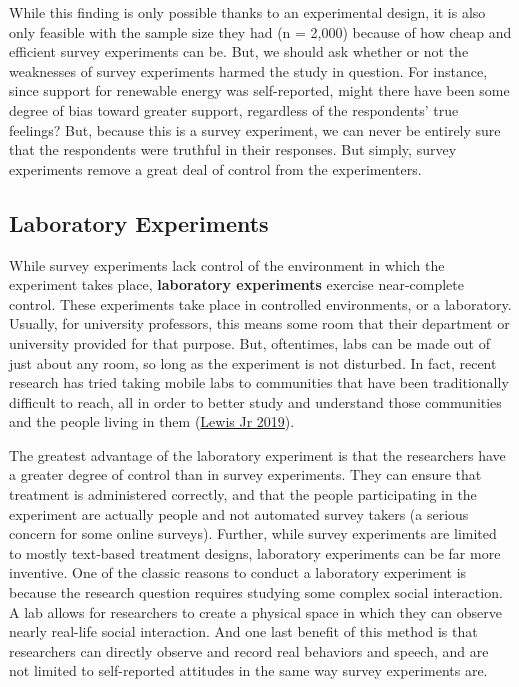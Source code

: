 \documentclass{book}
\begin{document}
While this finding is only possible thanks to an experimental design, it is
also only feasible with the sample size they had (n = 2,000) because of how
cheap and efficient survey experiments can be. But, we should ask whether or
not the weaknesses of survey experiments harmed the study in question. For
instance, since support for renewable energy was self-reported, might there
have been some degree of bias toward greater support, regardless of the
respondents' true feelings? But, because this is a survey experiment, we can
never be entirely sure that the respondents were truthful in their responses.
But simply, survey experiments remove a great deal of control from the
experimenters.

\hypertarget{laboratory-experiments}{%
\subsection{Laboratory Experiments}\label{laboratory-experiments}}

While survey experiments lack control of the environment in which the
experiment takes place, \textbf{laboratory experiments} exercise near-complete
control. These experiments take place in controlled environments, or a
laboratory. Usually, for university professors, this means some room that
their department or university provided for that purpose. But, oftentimes,
labs can be made out of just about any room, so long as the experiment is not
disturbed. In fact, recent research has tried taking mobile labs to
communities that have been traditionally difficult to reach, all in order to
better study and understand those communities and the people living in them
(\protect\hyperlink{ref-neil_a._lewis_studying_2019}{Lewis Jr 2019}).

The greatest advantage of the laboratory experiment is that the researchers
have a greater degree of control than in survey experiments. They can ensure
that treatment is administered correctly, and that the people participating in
the experiment are actually people and not automated survey takers (a serious
concern for some online surveys). Further, while survey experiments are
limited to mostly text-based treatment designs, laboratory experiments can be
far more inventive. One of the classic reasons to conduct a laboratory
experiment is because the research question requires studying some complex
social interaction. A lab allows for researchers to create a physical space in
which they can observe nearly real-life social interaction. And one last
benefit of this method is that researchers can directly observe and record
real behaviors and speech, and are not limited to self-reported attitudes in
the same way survey experiments are.
\end{document}
